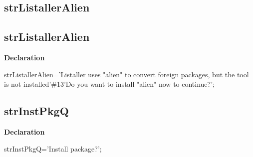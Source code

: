 \documentclass{report}
\newif\ifpdf
\begin{document}
\subsection*{\large{\textbf{strListallerAlien}}\normalsize\hspace{1ex}\hrulefill}
\else
\subsection*{strListallerAlien}
\fi
\label{trstrings-strListallerAlien}
\begin{list}{}{
\setlength{\itemindent}{0cm}
\setlength{\listparindent}{0cm}
\setlength{\leftmargin}{\evensidemargin}
\addtolength{\leftmargin}{\tmplength}
\settowidth{\labelsep}{X}
\addtolength{\leftmargin}{\labelsep}
\setlength{\labelwidth}{\tmplength}
}
\item[\textbf{Declaration}\hfill]
\ifpdf
\begin{flushleft}
\fi
\begin{ttfamily}
strListallerAlien='Listaller uses "alien" to convert foreign packages, but the tool is not installed'{\#}13'Do you want to install "alien" now to continue?';\end{ttfamily}

\ifpdf
\end{flushleft}
\fi

\end{list}
\ifpdf
\subsection*{\large{\textbf{strInstPkgQ}}\normalsize\hspace{1ex}\hrulefill}
\else
\subsection*{strInstPkgQ}
\fi
\label{trstrings-strInstPkgQ}
\begin{list}{}{
\setlength{\itemindent}{0cm}
\setlength{\listparindent}{0cm}
\setlength{\leftmargin}{\evensidemargin}
\addtolength{\leftmargin}{\tmplength}
\settowidth{\labelsep}{X}
\addtolength{\leftmargin}{\labelsep}
\setlength{\labelwidth}{\tmplength}
}
\item[\textbf{Declaration}\hfill]
\ifpdf
\begin{flushleft}
\fi
\begin{ttfamily}
strInstPkgQ='Install package?';\end{ttfamily}

\ifpdf
\end{flushleft}
\fi

\end{list}
\ifpdf
\end{document}
